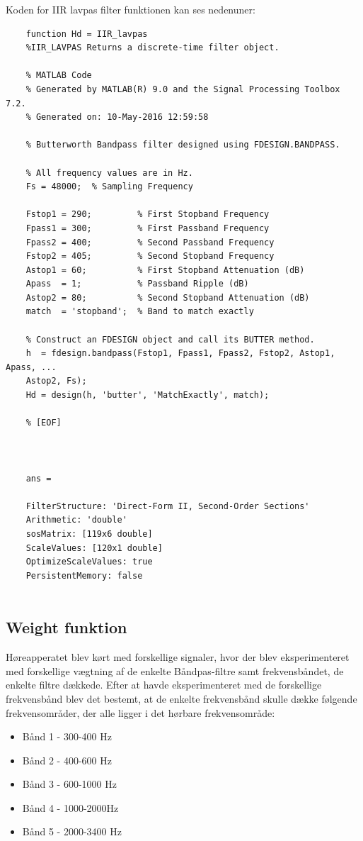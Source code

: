 Koden for IIR lavpas filter funktionen kan ses nedenuner:
\begin{verbatim}
	function Hd = IIR_lavpas
	%IIR_LAVPAS Returns a discrete-time filter object.
	
	% MATLAB Code
	% Generated by MATLAB(R) 9.0 and the Signal Processing Toolbox 7.2.
	% Generated on: 10-May-2016 12:59:58
	
	% Butterworth Bandpass filter designed using FDESIGN.BANDPASS.
	
	% All frequency values are in Hz.
	Fs = 48000;  % Sampling Frequency
	
	Fstop1 = 290;         % First Stopband Frequency
	Fpass1 = 300;         % First Passband Frequency
	Fpass2 = 400;         % Second Passband Frequency
	Fstop2 = 405;         % Second Stopband Frequency
	Astop1 = 60;          % First Stopband Attenuation (dB)
	Apass  = 1;           % Passband Ripple (dB)
	Astop2 = 80;          % Second Stopband Attenuation (dB)
	match  = 'stopband';  % Band to match exactly
	
	% Construct an FDESIGN object and call its BUTTER method.
	h  = fdesign.bandpass(Fstop1, Fpass1, Fpass2, Fstop2, Astop1, Apass, ...
	Astop2, Fs);
	Hd = design(h, 'butter', 'MatchExactly', match);
	
	% [EOF]
	
	
	
	ans =
	
	FilterStructure: 'Direct-Form II, Second-Order Sections'
	Arithmetic: 'double'                               
	sosMatrix: [119x6 double]                         
	ScaleValues: [120x1 double]                         
	OptimizeScaleValues: true                                   
	PersistentMemory: false
	
\end{verbatim}

\subsection{Weight funktion}

Høreapperatet blev kørt med forskellige signaler, hvor der blev eksperimenteret med forskellige vægtning af de enkelte Båndpas-filtre samt frekvensbåndet, de enkelte filtre dækkede. Efter at havde eksperimenteret med de forskellige frekvensbånd blev det bestemt, at de enkelte frekvensbånd skulle dække følgende frekvensområder, der alle ligger i det hørbare frekvensområde:
\begin{itemize}
	\item Bånd 1 - 300-400 Hz
	\item Bånd 2 - 400-600 Hz
	\item Bånd 3 - 600-1000 Hz
	\item Bånd 4 - 1000-2000Hz
	\item Bånd 5 - 2000-3400 Hz
\end{itemize}

